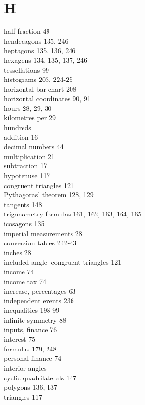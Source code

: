 \documentclass[10pt]{article}
\begin{document}
\section*{H}
half fraction 49\\
hendecagons 135, 246\\
heptagons 135, 136, 246\\
hexagons 134, 135, 137, 246\\
tessellations 99\\
histograms 203, 224-25\\
horizontal bar chart 208\\
horizontal coordinates 90, 91\\
hours 28, 29, 30\\
kilometres per 29\\
hundreds\\
addition 16\\
decimal numbers 44\\
multiplication 21\\
subtraction 17\\
hypotenuse 117\\
congruent triangles 121\\
Pythagoras' theorem 128, 129\\
tangents 148\\
trigonometry formulas 161, 162, 163, 164, 165\\
icosagons 135\\
imperial measurements 28\\
conversion tables 242-43\\
inches 28\\
included angle, congruent triangles 121\\
income 74\\
income tax 74\\
increase, percentages 63\\
independent events 236\\
inequalities 198-99\\
infinite symmetry 88\\
inputs, finance 76\\
interest 75\\
formulas 179, 248\\
personal finance 74\\
interior angles\\
cyclic quadrilaterals 147\\
polygons 136, 137\\
triangles 117\\
\end{document}
